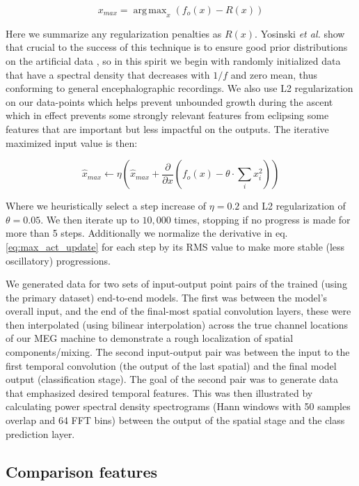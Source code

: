 \documentclass[fleqn,10pt]{wlscirep}
\DeclareMathOperator*{\argmaxA}{arg\,max}
\begin{document}
\begin{equation} \label{eq:max_act}
  x_{max} = \argmaxA_x(f_o(x) - R(x))
\end{equation}

Here we summarize any regularization penalties as $R(x)$. Yosinski {\em et al.} show that crucial to the success of this technique is to ensure good prior distributions on the artificial data \cite{Yosinski2015}, so in this spirit we begin with randomly initialized data that have a spectral density that decreases with $1/f$ and zero mean, thus conforming to general encephalographic recordings. We also use L2 regularization on our data-points which helps prevent unbounded growth during the ascent which in effect prevents some strongly relevant features from eclipsing some features that are important but less impactful on the outputs. The iterative maximized input value is then:

\begin{equation} \label{eq:max_act_update}
  \hat{x}_{max} \leftarrow \eta \left(\hat{x}_{max} + \frac{\partial }{\partial x}(f_o(x) - \theta \cdot {}\sum_ix_i^2) \right)
\end{equation}

Where we heuristically select a step increase of $\eta = 0.2$ and L2 regularization of $\theta = 0.05$. We then iterate up to $10,000$ times, stopping if no progress is made for more than 5 steps. Additionally we normalize the derivative in eq. \ref{eq:max_act_update} for each step by its RMS value to make more stable (less oscillatory) progressions.

We generated data for two sets of input-output point pairs of the trained (using the primary dataset) end-to-end models. The first was between the model's overall input, and the end of the final-most spatial convolution layers, these were then interpolated (using bilinear interpolation) across the true channel locations of our MEG machine to demonstrate a rough localization of spatial components/mixing. The second input-output pair was between the input to the first temporal convolution (the output of the last spatial) and the final model output (classification stage). The goal of the second pair was to generate data that emphasized desired temporal features. This was then illustrated by calculating power spectral density spectrograms (Hann windows with 50 samples overlap and 64 FFT bins) between the output of the spatial stage and the class prediction layer.

\subsection*{Comparison features}
\end{document}
